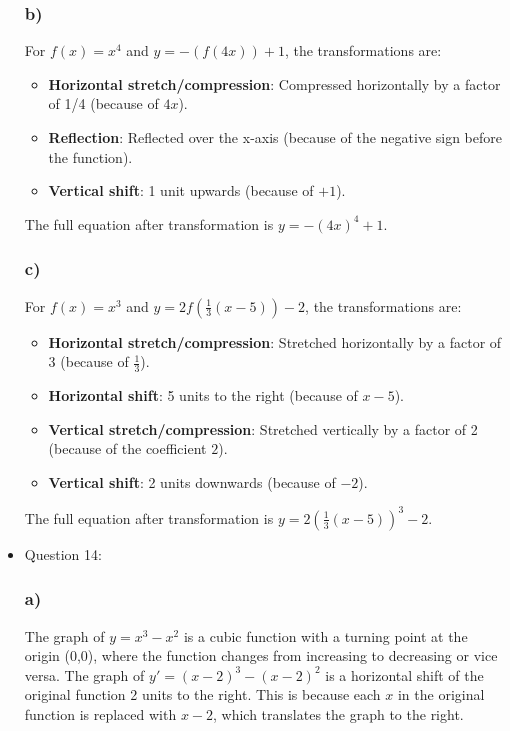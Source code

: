 \documentclass{article}
\begin{document}
\begin{itemize}
\subsubsection*{b)}
For \( f(x) = x^4 \) and \( y = -(f(4x)) + 1 \), the transformations are:
\begin{itemize}
    \item \textbf{Horizontal stretch/compression}: Compressed horizontally by a factor of 1/4 (because of \( 4x \)).
    \item \textbf{Reflection}: Reflected over the x-axis (because of the negative sign before the function).
    \item \textbf{Vertical shift}: 1 unit upwards (because of \( + 1 \)).
\end{itemize}
The full equation after transformation is \( y = -(4x)^4 + 1 \).

\subsubsection*{c)}
For \( f(x) = x^3 \) and \( y = 2f\left(\frac{1}{3}(x - 5)\right) - 2 \), the transformations are:
\begin{itemize}
    \item \textbf{Horizontal stretch/compression}: Stretched horizontally by a factor of 3 (because of \( \frac{1}{3} \)).
    \item \textbf{Horizontal shift}: 5 units to the right (because of \( x - 5 \)).
    \item \textbf{Vertical stretch/compression}: Stretched vertically by a factor of 2 (because of the coefficient \( 2 \)).
    \item \textbf{Vertical shift}: 2 units downwards (because of \( - 2 \)).
\end{itemize}
The full equation after transformation is \( y = 2\left(\frac{1}{3}(x - 5)\right)^3 - 2 \).

\item Question 14:
\subsubsection*{a)}
The graph of \( y = x^3 - x^2 \) is a cubic function with a turning point at the origin (0,0), where the function changes from increasing to decreasing or vice versa. The graph of \( y' = (x - 2)^3 - (x - 2)^2 \) is a horizontal shift of the original function 2 units to the right. This is because each \( x \) in the original function is replaced with \( x - 2 \), which translates the graph to the right.


\end{itemize}
\end{document}
